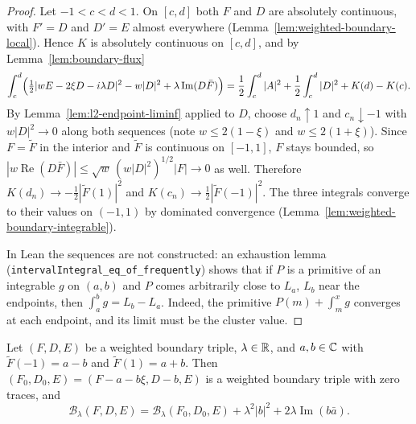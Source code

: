 \begin{proof}
\leanok
Let $-1<c<d<1$. On $[c,d]$ both $F$ and $D$ are absolutely continuous, with
$F'=D$ and $D'=E$ almost everywhere
(Lemma~\ref{lem:weighted-boundary-local}). Hence $K$ is absolutely
continuous on $[c,d]$, and by Lemma~\ref{lem:boundary-flux}
\[
  \int_c^d\Bigl(\tfrac12|wE-2\xi D-i\lambda D|^2-w|D|^2
     +\lambda\operatorname{Im}(D\bar F)\Bigr)
  =\frac12\int_c^d|A|^2+\frac12\int_c^d|D|^2+K(d)-K(c).
\]
By Lemma~\ref{lem:l2-endpoint-liminf} applied to $D$, choose $d_n\uparrow1$
and $c_n\downarrow-1$ with $w|D|^2\to0$ along both sequences (note
$w\le2(1-\xi)$ and $w\le2(1+\xi)$). Since $F=\widetilde F$ in the interior
and $\widetilde F$ is continuous on $[-1,1]$, $F$ stays bounded, so
$|w\operatorname{Re}(D\bar F)|\le\sqrt w\,(w|D|^2)^{1/2}|F|\to0$ as well.
Therefore $K(d_n)\to-\tfrac12|\widetilde F(1)|^2$ and
$K(c_n)\to\tfrac12|\widetilde F(-1)|^2$. The three integrals converge to
their values on $(-1,1)$ by dominated convergence
(Lemma~\ref{lem:weighted-boundary-integrable}).

In Lean the sequences are not constructed: an exhaustion lemma
(\texttt{intervalIntegral\_eq\_of\_frequently}) shows that if $P$ is a
primitive of an integrable $g$ on $(a,b)$ and $P$ comes arbitrarily close to
$L_a$, $L_b$ near the endpoints, then $\int_a^bg=L_b-L_a$. Indeed, the
primitive $P(m)+\int_m^xg$ converges at each endpoint, and its limit must be
the cluster value.
\end{proof}

\begin{lemma}
\label{lem:weighted-affine-splitting}
\leanok
Let $(F,D,E)$ be a weighted boundary triple, $\lambda\in\mathbb{R}$, and $a,b\in\mathbb{C}$
with $\widetilde F(-1)=a-b$ and $\widetilde F(1)=a+b$. Then
$(F_0,D_0,E)=(F-a-b\xi,D-b,E)$ is a weighted boundary triple with zero
traces, and
\[
  \mathcal B_\lambda(F,D,E)=\mathcal B_\lambda(F_0,D_0,E)
    +\lambda^2|b|^2+2\lambda\operatorname{Im}(b\bar a).
\]
\end{lemma}

